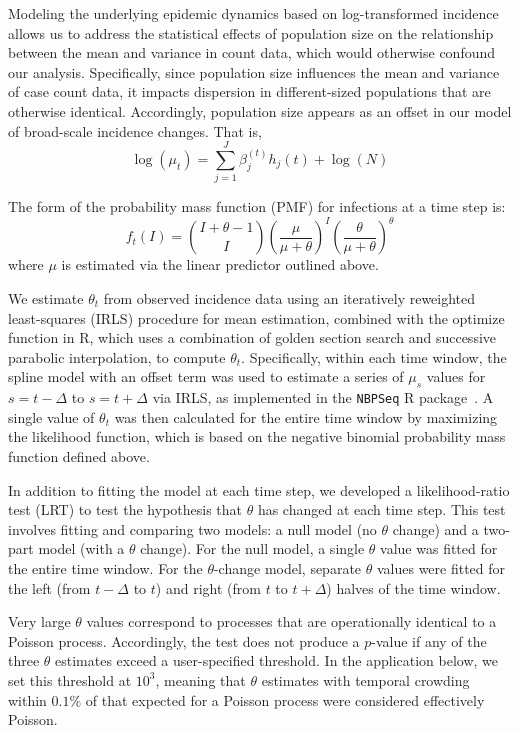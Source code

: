 \documentclass[11pt,letterpaper]{article}
\begin{document}
\begin{Abstract}
Modeling the underlying epidemic dynamics based on log-transformed incidence allows us to address the statistical effects of population size on the relationship between the mean and variance in count data, which would otherwise confound our analysis.
Specifically, since population size influences the mean and variance of case count data, it impacts dispersion in different-sized populations that are otherwise identical.
Accordingly, population size appears as an offset in our model of broad-scale incidence changes. That is,
\begin{equation}
  \log(\mu_t) = \sum_{j=1}^J \beta_j^{(t)} h_j(t) + \log(N) 
\end{equation}

The form of the probability mass function (PMF) for infections at a time step is:
\begin{equation}
  f_t(I) = \binom{I + \theta - 1}{I} {\left( \frac{\mu}{\mu + \theta} \right)}^I {\left( \frac{\theta}{\mu + \theta} \right)}^\theta
\end{equation}
where $\mu$ is estimated via the linear predictor outlined above. 

We estimate $\theta_t$ from observed incidence data using an iteratively reweighted least-squares (IRLS) procedure for mean estimation, combined with the optimize function in R, which uses a combination of golden section search and successive parabolic interpolation, to compute $\theta_t$. 
Specifically, within each time window, the spline model with an offset term was used to estimate a series of $\mu_s$ values for $s = t-\Delta$ to $s = t + \Delta$ via IRLS, as implemented in the \texttt{NBPSeq} R package~\citep{di2015nbpseq}. 
A single value of $\theta_t$ was then calculated for the entire time window by maximizing the likelihood function, which is based on the negative binomial probability mass function defined above.

In addition to fitting the model at each time step, we developed a likelihood-ratio test (LRT) to test the hypothesis that $\theta$ has changed at each time step. 
This test involves fitting and comparing two models: a null model (no $\theta$ change) and a two-part model (with a $\theta$ change). 
For the null model, a single $\theta$ value was fitted for the entire time window. 
For the $\theta$-change model, separate $\theta$ values were fitted for the left (from $t-\Delta$ to $t$) and right (from $t$ to $t + \Delta$) halves of the time window.

Very large $\theta$ values correspond to processes that are operationally identical to a Poisson process. 
Accordingly, the test does not produce a $p$-value if any of the three $\theta$ estimates exceed a user-specified threshold. 
In the application below, we set this threshold at $10^3$, meaning that $\theta$ estimates with temporal crowding within $0.1\%$ of that expected for a Poisson process were considered effectively Poisson.


\end{Abstract}
\end{document}

